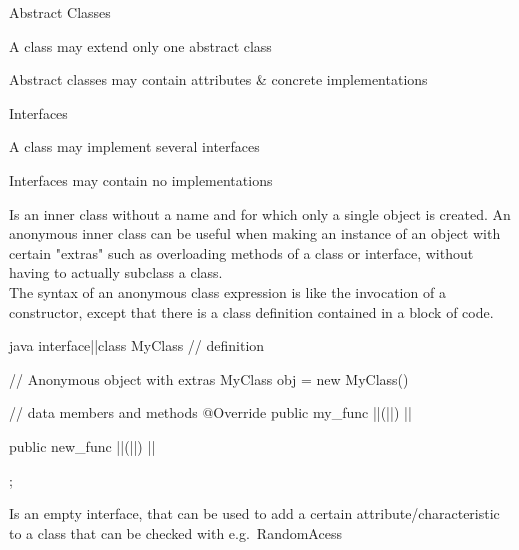 \begin{notebox}\nospacing
  \begin{itemizenosep}
      \item Abstract Classes
    \begin{itemizenosep}
        \item A class may extend only one abstract class
        \item Abstract classes may contain attributes \& concrete implementations
    \end{itemizenosep}
      \item Interfaces
    \begin{itemizenosep}
        \item A class may implement several interfaces
        \item Interfaces may contain no implementations 
    \end{itemizenosep}
  \end{itemizenosep}
\end{notebox}
\begin{defnbox}\nospacing
  \begin{defn}
    Is an inner class without a name and for which only a single object is
    created.
    An anonymous inner class can be useful when making an instance of an object
    with certain "extras"
    such as overloading methods of a class or interface, without having to
    actually subclass a class.\\
    The syntax of an anonymous class expression is like the invocation of a
    constructor,
    except that there is a class definition contained in a block of code.
\begin{mintlinebox}{java}
interface|\optc{/}|class MyClass{
  // definition
}

// Anonymous object with extras
MyClass obj = new MyClass() 
{
  // data members and methods
  @Override
  public my_func ||(||) 
  {
    |\optldots|
  }   

  public new_func ||(||) 
  {
    |\optldots|
  }   
};
\end{mintlinebox}
  \end{defn}
\end{defnbox}
\begin{defnbox}\nospacing
  \begin{defn}\label{defn:markerInerface}
    Is an empty interface, that can be used to add a certain
    attribute/characteristic to a class that can be checked with
     e.g.\ RandomAcess 
  \end{defn}
\end{defnbox}

